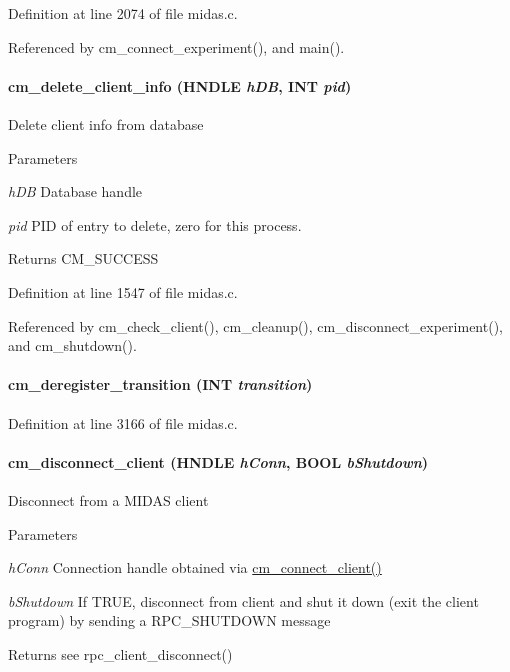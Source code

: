 Definition at line 2074 of file midas.c.

Referenced by cm\_\-connect\_\-experiment(), and main().
\paragraph[{cm\_\-delete\_\-client\_\-info}]{ cm\_\-delete\_\-client\_\-info (HNDLE {\em hDB}, \/  {\bf INT} {\em pid})}\hfill\label{group__cmfunctionc_gace4f91b59217b2dc6216065cc41377a1}
Delete client info from database 
\begin{DoxyParams}{Parameters}
\item[{\em hDB}]Database handle \item[{\em pid}]PID of entry to delete, zero for this process. \end{DoxyParams}
\begin{DoxyReturn}{Returns}
CM\_\-SUCCESS 
\end{DoxyReturn}


Definition at line 1547 of file midas.c.

Referenced by cm\_\-check\_\-client(), cm\_\-cleanup(), cm\_\-disconnect\_\-experiment(), and cm\_\-shutdown().
\paragraph[{cm\_\-deregister\_\-transition}]{ cm\_\-deregister\_\-transition ({\bf INT} {\em transition})}\hfill\label{group__cmfunctionc_gabc04b8293c8387a6ea4f506edf746df7}


Definition at line 3166 of file midas.c.
\paragraph[{cm\_\-disconnect\_\-client}]{ cm\_\-disconnect\_\-client (HNDLE {\em hConn}, \/  {\bf BOOL} {\em bShutdown})}\hfill\label{group__cmfunctionc_ga084b807db46901ac411824a94f59645d}
Disconnect from a MIDAS client 
\begin{DoxyParams}{Parameters}
\item[{\em hConn}]Connection handle obtained via \hyperlink{group__cmfunctionc_ga6a8a21234c7ce94bdf26bbcbcf778a39}{cm\_\-connect\_\-client()} \item[{\em bShutdown}]If TRUE, disconnect from client and shut it down (exit the client program) by sending a RPC\_\-SHUTDOWN message \end{DoxyParams}
\begin{DoxyReturn}{Returns}
see rpc\_\-client\_\-disconnect() 
\end{DoxyReturn}


